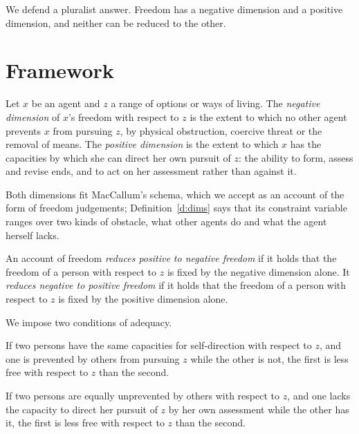 \documentclass{situationist-preprint}
\begin{document}
We defend a pluralist answer. Freedom has a negative dimension and a positive dimension, and neither can be reduced to the other.

\section{Framework}

\begin{definition}\label{d:dims}
Let $x$ be an agent and $z$ a range of options or ways of living. The \emph{negative dimension} of $x$'s freedom with respect to $z$ is the extent to which no other agent prevents $x$ from pursuing $z$, by physical obstruction, coercive threat or the removal of means. The \emph{positive dimension} is the extent to which $x$ has the capacities by which she can direct her own pursuit of $z$: the ability to form, assess and revise ends, and to act on her assessment rather than against it.
\end{definition}

Both dimensions fit MacCallum's schema, which we accept as an account of the form of freedom judgements; Definition~\ref{d:dims} says that its constraint variable ranges over two kinds of obstacle, what other agents do and what the agent herself lacks.

\begin{definition}\label{d:reduce}
An account of freedom \emph{reduces positive to negative freedom} if it holds that the freedom of a person with respect to $z$ is fixed by the negative dimension alone. It \emph{reduces negative to positive freedom} if it holds that the freedom of a person with respect to $z$ is fixed by the positive dimension alone.
\end{definition}

We impose two conditions of adequacy.

\begin{principle}[Prevention]\label{p:prevent}
If two persons have the same capacities for self-direction with respect to $z$, and one is prevented by others from pursuing $z$ while the other is not, the first is less free with respect to $z$ than the second.
\end{principle}

\begin{principle}\label{p:self}
If two persons are equally unprevented by others with respect to $z$, and one lacks the capacity to direct her pursuit of $z$ by her own assessment while the other has it, the first is less free with respect to $z$ than the second.
\end{principle}
\end{document}

